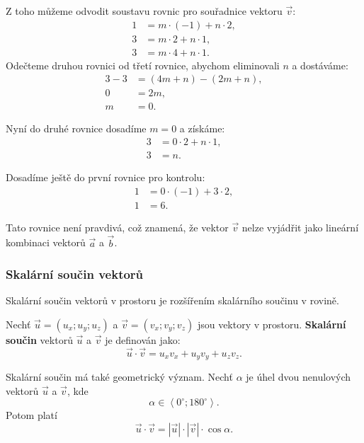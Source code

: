 \begin{example}
    Z toho můžeme odvodit soustavu rovnic pro souřadnice vektoru $\vec{v}$:
    \begin{align*}
        1 &= m \cdot (-1) + n \cdot 2,\\
        3 &= m \cdot 2 + n \cdot 1,\\
        3 &= m \cdot 4 + n \cdot 1.
    \end{align*}
    Odečteme druhou rovnici od třetí rovnice, abychom eliminovali $n$ a dostáváme:
    \begin{align*}
        3 - 3 &= (4m + n) - (2m + n),\\
        0 &= 2m,\\
        m &= 0.
    \end{align*}

    Nyní do druhé rovnice dosadíme $m = 0$ a získáme:
    \begin{align*}
        3 &= 0 \cdot 2 + n \cdot 1,\\
        3 &= n. 
    \end{align*}

    Dosadíme ještě do první rovnice pro kontrolu:
    \begin{align*}
        1 &= 0 \cdot (-1) + 3 \cdot 2,\\
        1 &= 6.
    \end{align*}

    Tato rovnice není pravdivá, což znamená, že vektor $\vec{v}$ nelze vyjádřit jako lineární kombinaci vektorů $\vec{a}$ a $\vec{b}$.
\end{example}


\subsubsection{Skalární součin vektorů}\label{subsubsec:Dot_product_of_vectors_in_space}

Skalární součin vektorů v prostoru je rozšířením skalárního součinu v rovině.
\begin{definition}\label{def:dot_product_space}
    Nechť $\vec{u} = (u_x; u_y; u_z)$ a $\vec{v} = (v_x; v_y; v_z)$ jsou vektory v prostoru. 
    \textbf{Skalární součin} vektorů $\vec{u}$ a $\vec{v}$ je definován jako:
    \begin{equation}\label{eq:dot_product_space}
        \vec{u} \cdot \vec{v} = u_x v_x + u_y v_y + u_z v_z.
    \end{equation}
\end{definition}

Skalární součin má také geometrický význam. Nechť $\alpha$ je úhel
dvou nenulových vektorů $\vec{u}$ a $\vec{v}$, kde
\[
    \alpha\in\left\langle 0^\circ;180^\circ\right\rangle.
\]
Potom platí
\begin{equation}
    \vec{u}\cdot\vec{v}
    =
    |\vec{u}|\cdot|\vec{v}|\cdot\cos\alpha.
    \label{eq:Dot_product_angle_space}
\end{equation}

